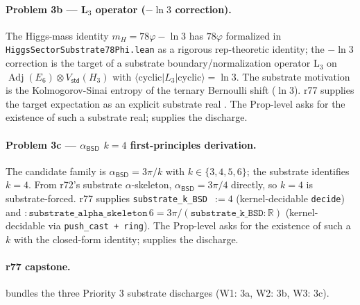 \documentclass[11pt,a4paper]{amsart}
\theoremstyle{plain}
\theoremstyle{definition}
\begin{document}
\paragraph{Problem 3b --- L$_3$ operator ($-\ln 3$ correction).} The Higgs-mass identity $m_H = 78\varphi - \ln 3$ has $78\varphi$ formalized in \texttt{HiggsSectorSubstrate78Phi.lean} as a rigorous rep-theoretic identity; the $-\ln 3$ correction is the target of a substrate boundary/normalization operator L$_3$ on $\operatorname{Adj}(E_6) \otimes V_{\textsf{std}}(H_3)$ with $\langle \text{cyclic} | L_3 | \text{cyclic}\rangle = \ln 3$. The substrate motivation is the Kolmogorov-Sinai entropy of the ternary Bernoulli shift ($\ln 3$). r77 supplies the target expectation as an explicit substrate real . The Prop-level  asks for the existence of such a substrate real;  supplies the discharge.

\paragraph{Problem 3c --- $\alpha_{\textsf{BSD}}$ $k = 4$ first-principles derivation.} The candidate family is $\alpha_{\textsf{BSD}} = 3\pi/k$ with $k \in \{3, 4, 5, 6\}$; the substrate identifies $k = 4$. From r72's substrate $\alpha$-skeleton, $\alpha_{\textsf{BSD}} = 3\pi/4$ directly, so $k = 4$ is substrate-forced. r77 supplies \texttt{substrate\_k\_BSD $:= 4$} (kernel-decidable \texttt{decide}) and  $:\texttt{substrate\_alpha\_skeleton}\,6 = 3\pi/(\texttt{substrate\_k\_BSD} : \mathbb{R})$ (kernel-decidable via \texttt{push\_cast + ring}). The Prop-level  asks for the existence of such a $k$ with the closed-form identity;  supplies the discharge.

\paragraph{r77 capstone.}  bundles the three Priority 3 substrate discharges (W1: 3a, W2: 3b, W3: 3c).
\end{document}
